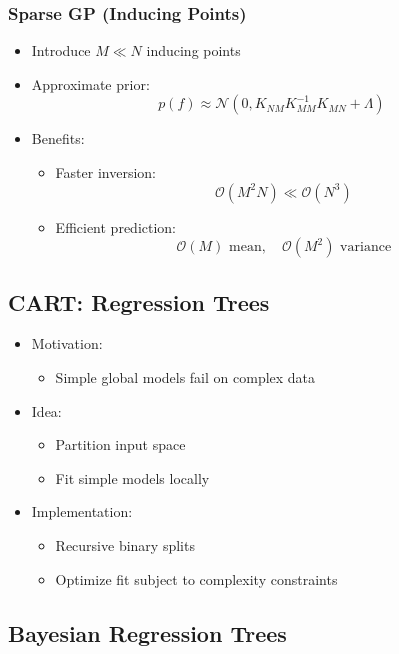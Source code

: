 \documentclass[12pt,oneside]{book}
\numberwithin{equation}{section}
\theoremstyle{definition}
\theoremstyle{plain}
\theoremstyle{remark}
\begin{document}
\subsubsection*{Sparse GP (Inducing Points)}

\begin{itemize}
\item Introduce $M \ll N$ inducing points

\item Approximate prior:
\[
p(f) \approx \mathcal{N}(0, K_{NM} K_{MM}^{-1} K_{MN} + \Lambda)
\]

\item Benefits:
\begin{itemize}
\item Faster inversion:
\[
\mathcal{O}(M^2 N) \ll \mathcal{O}(N^3)
\]
\item Efficient prediction:
\[
\mathcal{O}(M) \text{ mean}, \quad \mathcal{O}(M^2) \text{ variance}
\]
\end{itemize}
\end{itemize}

\subsection{CART: Regression Trees}

\begin{itemize}
\item Motivation:
\begin{itemize}
\item Simple global models fail on complex data
\end{itemize}

\item Idea:
\begin{itemize}
\item Partition input space
\item Fit simple models locally
\end{itemize}

\item Implementation:
\begin{itemize}
\item Recursive binary splits
\item Optimize fit subject to complexity constraints
\end{itemize}
\end{itemize}

\subsection{Bayesian Regression Trees}
\end{document}
